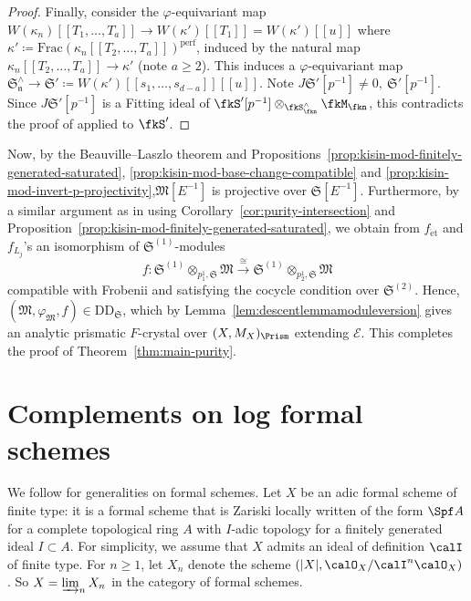 \begin{proof}
Finally, consider the $\varphi$-equivariant map $W(\kappa_n)[\![T_1, \ldots, T_a]\!] \rightarrow W(\kappa')[\![T_1]\!] = W(\kappa')[\![u]\!]$ where $\kappa' \coloneqq \mathrm{Frac}(\kappa_n[\![T_2, \ldots, T_a]\!])^{\mathrm{perf}}$, induced by the natural map $\kappa_n[\![T_2, \ldots, T_a]\!] \rightarrow \kappa'$ (note $a \geq 2$). This induces a $\varphi$-equivariant map $\mathfrak{S}_{\mathfrak{n}}^{\wedge} \rightarrow \mathfrak{S}' \coloneqq W(\kappa')[\![s_1, \ldots, s_{d-a}]\!][\![u]\!]$. Note $J\mathfrak{S}'[p^{-1}] \neq 0, ~\mathfrak{S}'[p^{-1}]$. Since $J\mathfrak{S}'[p^{-1}]$ is a Fitting ideal of $\fkS'[p^{-1}]\otimes_{\fkS_{\fkn}^\wedge}\fkM_{\fkn}$, this contradicts the proof of \cite[Lem.~4.12]{du-liu-moon-shimizu-completed-prismatic-F-crystal-loc-system} applied to $\fkS'$. 
\end{proof}

Now, by the Beauville--Laszlo theorem and Propositions~\ref{prop:kisin-mod-finitely-generated-saturated}, \ref{prop:kisin-mod-base-change-compatible} and \ref{prop:kisin-mod-invert-p-projectivity},$\mathfrak{M}[E^{-1}]$ is projective over $\mathfrak{S}[E^{-1}]$. Furthermore, by a similar argument as in \cite[Lem.~4.10, Pf.]{du-liu-moon-shimizu-completed-prismatic-F-crystal-loc-system} using Corollary~\ref{cor:purity-intersection} and Proposition~\ref{prop:kisin-mod-finitely-generated-saturated}, we obtain from $f_{\mathrm{\acute{e}t}}$ and $f_{L_j}$'s an isomorphism of $\mathfrak{S}^{(1)}$-modules
\[
f\colon \mathfrak{S}^{(1)}\otimes_{p^1_1,\mathfrak{S}}\mathfrak{M}\xrightarrow{\cong}\mathfrak{S}^{(1)}\otimes_{p^1_2,\mathfrak{S}}\mathfrak{M}
\]
compatible with Frobenii and satisfying the cocycle condition over $\mathfrak{S}^{(2)}$. Hence, $(\mathfrak{M}, \varphi_{\mathfrak{M}}, f) \in \mathrm{DD}_{\mathfrak{S}}$, which by Lemma~\ref{lem:descentlemmamoduleversion} gives an analytic prismatic $F$-crystal over $(X, M_X)_{\Prism}$ extending $\mathscr{E}$. This completes the proof of Theorem~\ref{thm:main-purity}.



\appendix

\section{Complements on log formal schemes} \label{sec:log-formal-scheme}


We follow \cite[Chap.~I]{fujiwara-kato} for generalities on formal schemes.
Let $X$ be an adic formal scheme of finite type: it is a formal scheme that is Zariski locally written of the form $\Spf A$ for a complete topological ring $A$ with $I$-adic topology for a finitely generated ideal $I\subset A$. For simplicity, we assume that $X$ admits an ideal of definition $\calI$ of finite type. For $n\geq 1$, let $X_n$ denote the scheme $(\lvert X\rvert,\calO_X/\calI^n\calO_X)$. So $X=\varinjlim_n X_n$  in the category of formal schemes.


